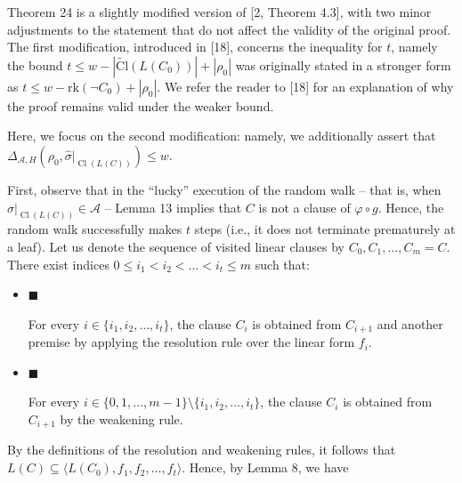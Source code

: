 Theorem 24 is a slightly modified version of [2, Theorem 4.3],
with two minor adjustments to the statement that do not affect the validity of the original proof.
The first modification, introduced in [18], concerns the inequality for $t$, namely the bound
$t\leq w-|\operatorname{\widetilde{Cl}}(L(C_{0}))|+|\rho_{0}|$ was originally stated in a stronger form as
$t\leq w-\mathrm{rk}{(\lnot C_{0})}+|\rho_{0}|$.
We refer the reader to [18] for an explanation of why the proof remains valid under the weaker bound.\par



Here, we focus on the second modification: namely, we additionally assert that
$\Delta_{\mathcal{A},H}(\rho_{0},\hat{\sigma}|_{\operatorname{Cl}(L(C))})\leq w$.\par



First, observe that in the “lucky” execution of the random walk – that is, when
$\hat{\sigma}|_{\operatorname{Cl}(L(C))}\in\mathcal{A}$ – Lemma 13 implies that $C$ is not a clause of $\varphi\circ g$.
Hence, the random walk successfully makes $t$ steps (i.e., it does not terminate prematurely at a leaf).
Let us denote the sequence of visited linear clauses by $C_{0},C_{1},\dots,C_{m}=C$.
There exist indices $0\leq i_{1}<i_{2}<\dots<i_{t}\leq m$ such that:\par


\begin{itemize}


\item 
$\blacksquare$ 


For every $i\in\{i_{1},i_{2},\dots,i_{t}\}$, the clause $C_{i}$ is obtained from $C_{i+1}$ and
another premise by applying the resolution rule over the linear form $f_{i}$.\par





\item 
$\blacksquare$ 


For every $i\in\{0,1,\dots,m-1\}\setminus\{i_{1},i_{2},\dots,i_{t}\}$,
the clause $C_{i}$ is obtained from $C_{i+1}$ by the weakening rule.\par





\end{itemize}


By the definitions of the resolution and weakening rules, it follows that
$L(C)\subseteq\langle L(C_{0}),f_{1},f_{2},\dots,f_{t}\rangle$. Hence, by Lemma 8, we have\par





